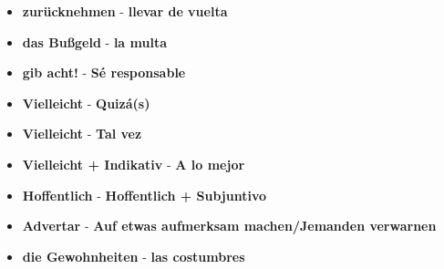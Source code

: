 \documentclass{article}
\begin{document}
\begin{multicols}{2}
\begin{itemize}
		\item{\textbf{zurücknehmen} - \textbf{llevar de vuelta}}
		\item{\textbf{das Bußgeld} - \textbf{la multa}}
		\item{\textbf{gib acht!} - \textbf{Sé responsable}}
		\item{\textbf{Vielleicht} - \textbf{Quizá(s)}}
		\item{\textbf{Vielleicht} - \textbf{Tal vez}}
		\item{\textbf{Vielleicht + Indikativ} - \textbf{A lo mejor}}
		\item{\textbf{Hoffentlich} - \textbf{Hoffentlich + Subjuntivo}}
		\item{\textbf{Advertar} - \textbf{Auf etwas aufmerksam machen/Jemanden verwarnen}}
		\item{\textbf{die Gewohnheiten} - \textbf{las costumbres}}
	\end{itemize}
	
		\end{multicols}
	
\end{document}
